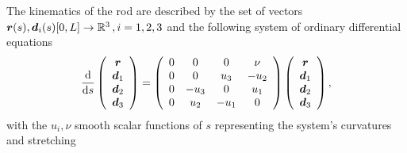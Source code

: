 \documentclass[a4paper,12pt]{article}
\begin{document}
\section{}
The kinematics of the rod  are described by the set of vectors $\v{r}(s),\v{d}_i(s)[0,L]\rightarrow \mathbb{R}^3\,,i=1,2,3$ and the following system of ordinary differential equations
\begin{equation*}
\label{fullkinematics}
\fd{}{s}
\left(\begin{array}{c} \v{r} \\ \v{d}_1 \\\v{d}_2\\ \v{d}_3 \end{array}\right) = 
\left(\begin{array}{cccc}
0 &0 & 0 & \nu \\
0 & 0 &  u_3 & -u_2\\
0 & -u_3 &  0 & u_1\\
0 & u_2 &  -u_1 & 0
\end{array}\right)
\left(\begin{array}{c}\v{r}\\ \v{d}_1 \\ \v{d}_2 \\ \v{d}_3 \end{array}\right),
\end{equation*}
with the $u_i,\nu$ smooth scalar functions of $s$ representing the system's curvatures and stretching
\end{document}
